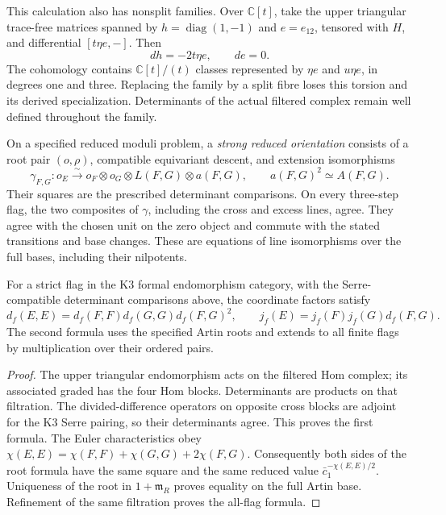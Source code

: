 This calculation also has nonsplit families.  Over \(\mathbb C[t]\),
take the upper triangular trace-free matrices spanned by
\(h=\operatorname{diag}(1,-1)\) and \(e=e_{12}\), tensored with
\(H\), and differential \([t\eta e,-]\).  Then
\[
 dh=-2t\eta e,\qquad de=0.
\]
The cohomology contains \(\mathbb C[t]/(t)\) classes represented by
\(\eta e\) and \(u\eta e\), in degrees one and three.  Replacing
the family by a split fibre loses this torsion and its derived
specialization.  Determinants of the actual filtered complex remain
well defined throughout the family.

\begin{definition}
\label{def:O1-strong-reduced-orientation}
On a specified reduced moduli problem, a \emph{strong reduced orientation}
consists of a root pair \((o,\rho)\), compatible equivariant descent, and
extension isomorphisms
\[
 \gamma_{F,G}:o_E\xrightarrow{\sim}
 o_F\otimes o_G\otimes L(F,G)\otimes a(F,G),
 \qquad a(F,G)^2\simeq A(F,G).
\]
Their squares are the prescribed determinant comparisons.  On every
three-step flag, the two composites of \(\gamma\), including the
cross and excess lines, agree.  They agree with the chosen unit on
the zero object and commute with the stated transitions and base
changes.  These are equations of line isomorphisms over the full
bases, including their nilpotents.
\end{definition}

\begin{proposition}
\label{prop:orientation-coordinate-flag}
For a strict flag in the K3 formal endomorphism category, with the
Serre-compatible determinant comparisons above, the coordinate
factors satisfy
\[
 d_f(E,E)=d_f(F,F)d_f(G,G)d_f(F,G)^2,
 \qquad
 j_f(E)=j_f(F)j_f(G)d_f(F,G).
\]
The second formula uses the specified Artin roots and extends to
all finite flags by multiplication over their ordered pairs.
\end{proposition}
\begin{proof}
The upper triangular endomorphism acts on the filtered Hom complex;
its associated graded has the four Hom blocks.  Determinants are
products on that filtration.  The divided-difference operators on
opposite cross blocks are adjoint for the K3 Serre pairing, so their
determinants agree.  This proves the first formula.  The Euler
characteristics obey
\(\chi(E,E)=\chi(F,F)+\chi(G,G)+2\chi(F,G)\).
Consequently both sides of the root formula have the same square
and the same reduced value \(\bar c_1^{-\chi(E,E)/2}\).  Uniqueness of
the root in \(1+\mathfrak m_R\) proves equality on the full Artin
base.  Refinement of the same filtration proves the all-flag formula.
\end{proof}

